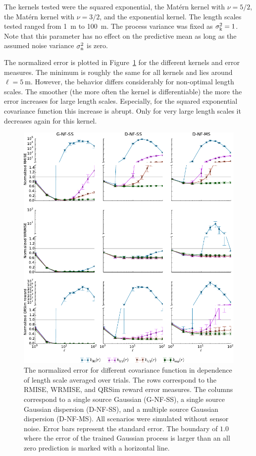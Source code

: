 The kernels tested were the squared exponential, the Mat\'ern kernel with $\nu 
= 5/2$, the Mat\'ern kernel with $\nu = 3/2$, and the exponential kernel. The 
length scales tested ranged from \SI{1}{\meter} to \SI{100}{\meter}. The process 
variance was fixed as $\sigma_{\mathrm{k}}^2 = 1$. Note that this parameter has no 
effect on the predictive mean as long as the assumed noise variance 
$\sigma_{\mathrm{n}}^2$ is zero.

The normalized error is plotted in Figure~\ref{fig:lengthscales} for the 
different kernels and error measures. The minimum is roughly the same for all 
kernels and lies around $\ell = \SI{5}{\meter}$.  However, the behavior differs 
considerably for non-optimal length scales.  The smoother (the more often the 
kernel is differentiable) the more the error increases for large length scales.  
Especially, for the squared exponential covariance function this increase is 
abrupt. Only for very large length scales it decreases again for this kernel.

\begin{figure}
    \centering
    \includegraphics{plots/lengthscales}
    \caption[Normalized error in dependence of covariance function and length 
    scale]{The normalized error for different covariance function in dependence 
        of length scale averaged over trials.  The rows correspond to the RMISE, 
        WRMISE, and QRSim reward error measures.  The columns correspond to 
        a single source Gaussian (G-NF-SS), a single source Gaussian dispersion 
        (D-NF-SS), and a multiple source Gaussian dispersion (D-NF-MS). All 
        scenarios were simulated without sensor noise.  Error bars represent the 
        standard error. The boundary of $1.0$ where the error of the trained 
        Gaussian process is larger than an all zero prediction is marked with 
        a horizontal line.}\label{fig:lengthscales}
\end{figure}

